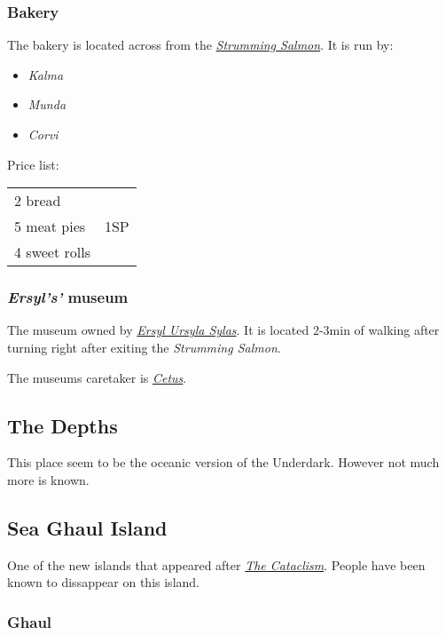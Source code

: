 \documentclass{article}
\begin{document}
\begin{multicols}{2}
    \subsubsection{Bakery}
    \label{bakery}

    The bakery is located across from the \hyperref[strumming_salmon]{\textit{Strumming Salmon}}. It is run by:

    \begin{itemize}
        \item \textit{Kalma}
        \item \textit{Munda}
        \item \textit{Corvi}
    \end{itemize}

    Price list:

    \begin{tabular}{l r}
        2 bread & \multirow{3}{1cm}{1SP} \\
        5 meat pies                      \\
        4 sweet rolls
    \end{tabular}

    \subsubsection{ \textit{Ersyl's'} museum}
    \label{museum}

    The museum owned by \hyperref[ersyl]{\textit{Ersyl Ursyla Sylas}}. It is located 2-3min of walking after turning right after exiting the \textit{Strumming Salmon}.

    The museums caretaker is \hyperref[cetus]{\textit{Cetus}}.

    \subsection{The Depths}
    \label{depths}

    This place seem to be the oceanic version of the Underdark. However not much more is known.

    \subsection{Sea Ghaul Island}
    \label{sea_ghaul_island}

    One of the new islands that appeared after \hyperref[cataclism]{\textit{The Cataclism}}. People have been known to dissappear on this island.

    \subsubsection{Ghaul}
    \label{ghaul}


\end{multicols}
\end{document}
